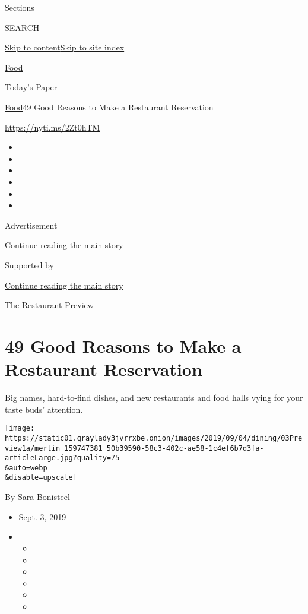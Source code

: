 Sections

SEARCH

\protect\hyperlink{site-content}{Skip to
content}\protect\hyperlink{site-index}{Skip to site index}

\href{https://www.nytimes3xbfgragh.onion/section/food}{Food}

\href{https://myaccount.nytimes3xbfgragh.onion/auth/login?response_type=cookie\&client_id=vi}{}

\href{https://www.nytimes3xbfgragh.onion/section/todayspaper}{Today's
Paper}

\href{/section/food}{Food}\textbar{}49 Good Reasons to Make a Restaurant
Reservation

\url{https://nyti.ms/2Zt0hTM}

\begin{itemize}
\item
\item
\item
\item
\item
\item
\end{itemize}

Advertisement

\protect\hyperlink{after-top}{Continue reading the main story}

Supported by

\protect\hyperlink{after-sponsor}{Continue reading the main story}

The Restaurant Preview

\hypertarget{49-good-reasons-to-make-a-restaurant-reservation}{%
\section{49 Good Reasons to Make a Restaurant
Reservation}\label{49-good-reasons-to-make-a-restaurant-reservation}}

Big names, hard-to-find dishes, and new restaurants and food halls vying
for your taste buds' attention.

\texttt{[image: https://static01.graylady3jvrrxbe.onion/images/2019/09/04/dining/03Preview1a/merlin\_159747381\_50b39590-58c3-402c-ae58-1c4ef6b7d3fa-articleLarge.jpg?quality=75\\\&auto=webp\\\&disable=upscale]}

By \href{https://www.nytimes3xbfgragh.onion/by/sara-bonisteel}{Sara
Bonisteel}

\begin{itemize}
\item
  Sept. 3, 2019
\item
  \begin{itemize}
  \item
  \item
  \item
  \item
  \item
  \item
  \end{itemize}
\end{itemize}

